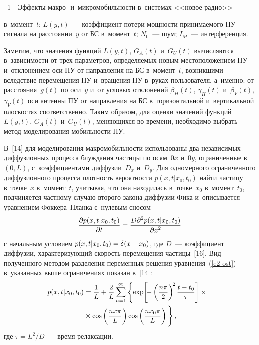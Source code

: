 \begin{multicols}{2}
{\begin{center}
\end{center}



\noindent
{{\figurename~1}\ \ \small{Эффекты макро- и~микромобильности в~системах <<новое радио>>
}}}

\vspace*{6pt}


\noindent
 в~момент~$t$; $L(y,t)$~--- коэффициент 
потери мощ\-ности принимаемого ПУ сигнала на расстоянии~$y$ от БС 
в~момент~$t$; $N_0$~--- шум; $I_M$~--- интерференция. 
  
  Заметим, что значения функций $L(y,t)$, $G_A(t)$ и~$G_U(t)$ вычисляются 
в~зависимости от трех па\-ра\-мет\-ров, определяемых новым местоположением ПУ 
и~отклонением оси ПУ от направления на БС в~момент~$t$, возникшими 
вследствие перемещения ПУ и~вращения ПУ в~руках пользователя, а~именно: от 
расстояния~$g(t)$ по оси~$y$ и~от угловых отклонений $\beta_H(t)$, 
$\gamma_H(t)$ и~$\beta_V(t)$, $\gamma_V(t)$ оси антенны ПУ от направления на 
БС в~горизонтальной и~вертикальной плоскостях соответственно. Таким образом, 
для оценки значений функций $L(y,t)$, $G_A(t)$ и~$G_U(t)$, меняющихся во 
времени, необходимо выбрать метод моделирования мобильности ПУ.
  
  
  В~[14] для моделирования мак\-ро\-мо\-биль\-ности использованы два независимых 
диффузионных процесса блуждания частицы по осям~$0x$ и~$0y$, ограниченные 
в~$(0,L)$, с~коэффициентами диффузии~$D_x$ и~$D_y$. Для одномерного 
ограниченного диффузионного процесса плотность вероятности $p(x, t\vert 
x_0,t_0)$ найти частицу в~точке~$x$ в~момент~$t$, учитывая, что она находилась в~точке~$x_0$ в~момент~$t_0$, подчиняется частному случаю второго закона 
диффузии Фика и~описывается уравнением Фок\-ке\-ра--План\-ка с~нулевым 
сносом
  \begin{equation}
  \displaystyle\frac{\displaystyle \partial p(x,t\vert x_0, t_0)\mathstrut}{\displaystyle \partial t\mathstrut} = \displaystyle\frac{\displaystyle D\partial^2 p(x,t\vert x_0, 
t_0)\mathstrut}{\displaystyle \partial x^2\mathstrut}
  \label{e2-ost}
  \end{equation}
с начальным условием $p(x,t\vert x_0, t_0)\hm= \delta(x\hm-x_0)$, 
где $D$~--- коэффициент диффузии, характеризующий скорость перемещения 
частицы~[16]. Вид полученного методом разделения переменных решения 
уравнения~(\ref{e2-ost}) в~указанных выше ограничениях показан в~[14]:
\begin{multline*}
\!\!\!p(x,t\vert x_0, t_0) =\fr{1}{L}+
\fr{2}{L}\sum\limits^\infty_{n=1} \left\{
\exp \!\left[ \!-\left( \fr{n\pi}{2}\right)^{\!2}
\fr{t-t_0}{\tau} \right] \times{}\right.\hspace*{-0.34721pt}\\
\left.{}\times \cos \left( \fr{nx\pi}{L}\right) \cos\left(\fr{nx_0\pi}{L}\right)
\vphantom{\left[ \!-\left( \fr{n\pi}{2}\right)^{\!2}
\fr{t-t_0}{\tau} \right]}
\right\},
\end{multline*}
где  $\tau=L^2/D$~--- время релаксации.
  

\end{multicols}
